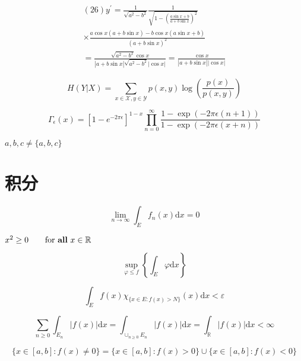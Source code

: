 \documentclass{article}
\begin{document}
    \[
    \begin{array}{l}{(26) y^{\prime}=\frac{1}{\sqrt{a^{2}-b^{2}}} \frac{1}{\sqrt{1-\left(\frac{a \sin x+b}{a+b \sin x}\right)^{2}}}} \\ {\times \frac{a \cos x(a+b \sin x)-b \cos x(a \sin x+b)}{(a+b \sin x)^{2}}} \\ {=\frac{\sqrt{a^{2}-b^{2}} \cos x}{|a+b \sin x| \sqrt{a^{2}-b^{2}}|\cos x|}=\frac{\cos x}{|a+b \sin x||\cos x|}}\end{array}
    \]

    \[
    H(Y | X)=\sum_{x \in \mathcal{X}, y \in \mathcal{Y}} p(x, y) \log \left(\frac{p(x)}{p(x, y)}\right)
    \]

    \[
    \Gamma_{\epsilon}(x)=\left[1-e^{-2 \pi \epsilon}\right]^{1-x} \prod_{n=0}^{\infty} \frac{1-\exp (-2 \pi \epsilon(n+1))}{1-\exp (-2 \pi \epsilon(x+n))}
    \]

    ${a,b,c}\neq \{a,b,c\}$ %

\section{积分}
    \[
    \lim _{n \rightarrow \infty} \int_{E} f_{n}(x) \mathrm{d} x=0
    \]

    $x^{2} \geq 0 \qquad
    \text{for \textbf{all} }
    x\in\mathbb{R}$

    \[
    \sup _{\varphi \leq f}\left\{\int_{E} \varphi \mathrm{d} x\right\}
    \]

    \[
    \int_{E} f(x) \chi_{\{x \in E: f(x)>N\}}(x) \mathrm{d} x<\varepsilon
    \]

    \[
    \sum_{n \geq 0} \int_{E_{n}}|f(x)| \mathrm{d} x=\int_{\cup_{n \geq 0} E_{n}}|f(x)| \mathrm{d} x=\int_{\mathbb{R}}|f(x)| \mathrm{d} x<\infty
    \]
    
    \[
    \{x \in[a, b]: f(x) \neq 0\}=\{x \in[a, b]: f(x)>0\} \cup\{x \in[a, b]: f(x)<0\}
    \]
\end{document}

